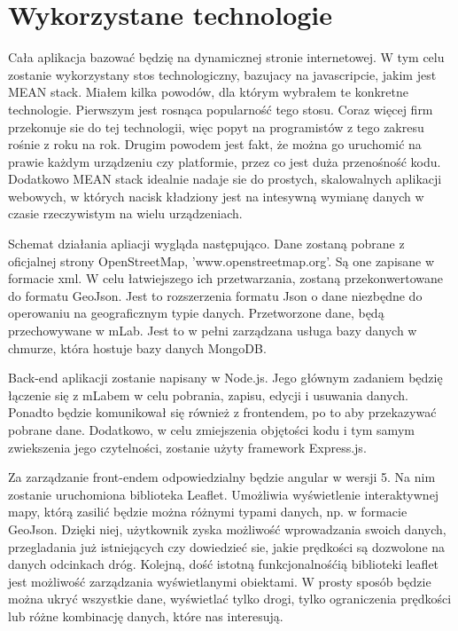 


\section{Wykorzystane technologie}
\label{sec:wykorzystaneTechnologie}
	Cała aplikacja bazować będzię na dynamicznej stronie internetowej. W tym celu zostanie wykorzystany stos technologiczny, bazujacy na javascripcie, jakim jest MEAN stack. Miałem kilka powodów, dla którym wybrałem te konkretne technologie. Pierwszym jest rosnąca popularność tego stosu. Coraz więcej firm przekonuje sie do tej technologii, więc popyt na programistów z tego zakresu rośnie z roku na rok. Drugim powodem jest fakt, że można go uruchomić na prawie każdym urządzeniu czy platformie, przez co jest duża przenośność kodu. Dodatkowo MEAN stack idealnie nadaje sie do prostych, skalowalnych aplikacji webowych, w których nacisk kładziony jest na intesywną wymianę danych w czasie rzeczywistym na wielu urządzeniach. 
	
	Schemat działania apliacji wygląda następująco. Dane zostaną pobrane z oficjalnej strony OpenStreetMap, 'www.openstreetmap.org'. Są one zapisane w formacie xml. W celu łatwiejszego ich przetwarzania, zostaną przekonwertowane do formatu GeoJson. Jest to rozszerzenia formatu Json o dane niezbędne do operowaniu na geograficznym typie danych. Przetworzone dane, będą przechowywane w mLab. Jest to w pełni zarządzana usługa bazy danych w chmurze, która hostuje bazy danych MongoDB. 

	Back-end aplikacji zostanie napisany w Node.js. Jego głównym zadaniem będzię łączenie się z mLabem w celu pobrania, zapisu, edycji i usuwania danych. Ponadto będzie komunikował się również z frontendem, po to aby przekazywać pobrane dane.  Dodatkowo, w celu zmiejszenia objętości kodu i tym samym zwiekszenia jego czytelności, zostanie użyty framework Express.js. 

	Za zarządzanie front-endem odpowiedzialny będzie angular w wersji 5. Na nim zostanie uruchomiona biblioteka Leaflet. Umożliwia wyświetlenie interaktywnej mapy, którą zasilić będzie można różnymi typami danych, np. w formacie GeoJson. Dzięki niej, użytkownik zyska możliwość wprowadzania swoich danych, przegladania już istniejących czy dowiedzieć sie, jakie prędkości są dozwolone na danych odcinkach dróg. Kolejną, dość istotną funkcjonalnośćią biblioteki leaflet jest możliwość zarządzania wyświetlanymi obiektami. W prosty sposób będzie można ukryć wszystkie dane, wyświetlać tylko drogi, tylko ograniczenia prędkości lub różne kombinację danych, które nas interesują. 
	

